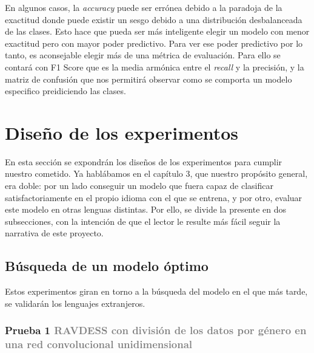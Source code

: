 \documentclass[11pt,a4paper,spanish]{book}
\begin{document}
	En algunos casos, la \emph{accuracy} puede ser errónea debido a la paradoja de la exactitud donde puede existir un sesgo debido a una distribución desbalanceada de las clases. Esto hace que pueda ser más inteligente elegir un modelo con menor exactitud pero con mayor poder predictivo.
	Para ver ese poder predictivo por lo tanto, es aconsejable elegir más de una métrica de evaluación. Para ello se contará con F1 Score que es la media armónica entre el \emph{recall} y la precisión, y la matriz de confusión que nos permitirá observar como se comporta un modelo especifico preidiciendo las clases.
	
	
	\section{Diseño de los experimentos}
	En esta sección se expondrán los diseños de los experimentos para cumplir nuestro cometido. Ya hablábamos en el capítulo 3, que nuestro propósito general, era doble: por un lado conseguir un modelo que fuera capaz de clasificar satisfactoriamente en el propio idioma con el que se entrena, y por otro, evaluar este modelo en otras lenguas distintas. Por ello, se divide la presente en dos subsecciones, con la intención de que el lector le resulte más fácil seguir la narrativa de este proyecto.
	
	\subsection{Búsqueda de un  modelo óptimo}
	Estos experimentos giran en torno a la búsqueda del modelo en el que más tarde, se validarán los lenguajes extranjeros.
	
	\subsubsection[]{\Large Prueba 1 {\normalsize \textcolor{Gray}{RAVDESS con división de los datos por género en una red convolucional unidimensional}}}
	
\end{document}

